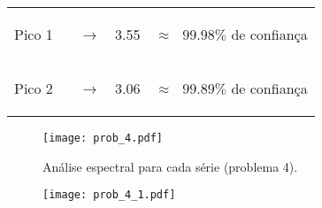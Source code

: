 \documentclass[12pt,portuguese,a4paper,pdftex]{article}
\renewcommand{\baselinestretch}{1.5}
\begin{document}
\begin{table}[ht]
\begin{center}
\vspace{.25cm}
\begin{tabular}{ccc}
\hline\hline
\begin{footnotesize} Pico 1 \ \ \  $\rightarrow$ \end{footnotesize} & \begin{footnotesize}3.55\end{footnotesize} & \begin{footnotesize} $\approx \ \ \  99.98\%$ de confiança \end{footnotesize}\\
\begin{footnotesize} Pico 2 \ \ \ $\rightarrow$ \end{footnotesize} & \begin{footnotesize}3.06\end{footnotesize} & \begin{footnotesize} $\approx \ \ \ 99.89\%$ de confiança \end{footnotesize}\\
\hline\hline
\end{tabular}
\end{center}
\end{table}




\vspace{-0.5cm}

\begin{figure}[ht]
\begin{center}
\texttt{[image: prob\_4.pdf]}
\end{center}
\vspace{-0.5cm}
\renewcommand{\baselinestretch}{.5}
\caption{\label{fig:prob_4} \small{Análise espectral para cada série (problema 4).}}
\end{figure}


\vspace{-0.5cm}

\begin{figure}[ht]
\begin{center}
\texttt{[image: prob\_4\_1.pdf]}
\end{center}
\vspace{-0.5cm}
\renewcommand{\baselinestretch}{.5}
\caption{\label{fig:prob_4_1} \small{}}
\end{figure}
\end{document}
